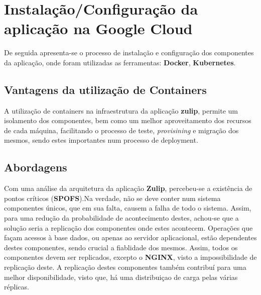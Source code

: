 \chapter{Instalação/Configuração da aplicação na Google Cloud}
De seguida apresenta-se o processo de instalação e configuração dos componentes da aplicação, onde foram utilizadas as ferramentas: \textbf{Docker}, \textbf{Kubernetes}. 

\section{Vantagens da utilização de Containers}
A utilização de containers na infraestrutura da aplicação \textbf{zulip}, permite um isolamento dos componentes, bem como um melhor aproveitamento dos recursos de cada máquina, facilitando o processo de teste, \emph{provisining} e migração dos mesmos, sendo estes importantes num processo de \textsf{deployment}.

\section{Abordagens}
Com uma análise da arquitetura da aplicação \textbf{Zulip}, percebeu-se a existência de pontos críticos (\textbf{SPOFS}).\newline Na verdade, não se deve conter num sistema componentes únicos, que em sua falta, causem a falha de todo o sistema. \newline Assim, para uma redução da probabilidade de acontecimento destes, achou-se que a solução seria a replicação dos componentes onde estes acontecem.
Operações que façam acessos à base dados, ou apenas ao servidor aplicacional, estão dependentes destes componentes, sendo crucial a fiablidade dos mesmos.
Assim, todos os componentes devem ser replicados, excepto o \textbf{NGINX}, visto a impossibilidade de replicação deste.\newline
A replicação destes componentes também contribuí para uma melhor disponibilidade, visto que, há uma distribuiçao de carga pelas várias réplicas.


